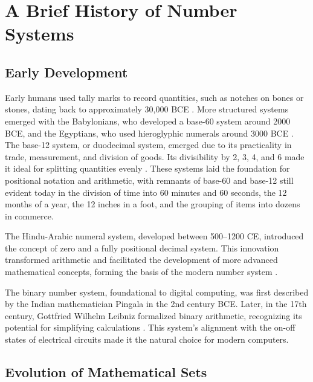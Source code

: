 \section{A Brief History of Number Systems}
\subsection{Early Development}
Early humans used tally marks to record quantities, such as notches on bones or stones, dating back to approximately 30,000 BCE \cite{ifrah2000universal}. More structured systems emerged with the Babylonians, who developed a base-60 system around 2000 BCE, and the Egyptians, who used hieroglyphic numerals around 3000 BCE \cite{ore1990number}. The base-12 system, or duodecimal system, emerged due to its practicality in trade, measurement, and division of goods. Its divisibility by 2, 3, 4, and 6 made it ideal for splitting quantities evenly \cite{wells2010number}. These systems laid the foundation for positional notation and arithmetic, with remnants of base-60 and base-12 still evident today in the division of time into 60 minutes and 60 seconds, the 12 months of a year, the 12 inches in a foot, and the grouping of items into dozens in commerce.

The Hindu-Arabic numeral system, developed between 500–1200 CE, introduced the concept of zero and a fully positional decimal system. This innovation transformed arithmetic and facilitated the development of more advanced mathematical concepts, forming the basis of the modern number system \cite{kline1990mathematics}.

The binary number system, foundational to digital computing, was first described by the Indian mathematician Pingala in the 2nd century BCE. Later, in the 17th century, Gottfried Wilhelm Leibniz formalized binary arithmetic, recognizing its potential for simplifying calculations \cite{kline1990mathematics}. This system’s alignment with the on-off states of electrical circuits made it the natural choice for modern computers.

\subsection{Evolution of Mathematical Sets}


